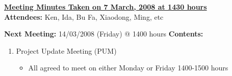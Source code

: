 \documentclass{letter}
\begin{document}
{\large \textbf{\underline{Meeting Minutes Taken on 7 March, 2008 at 1430 hours}}}\\

\textbf{Attendees:} Ken, Ida, Bu Fa, Xiaodong, Ming, etc

\textbf{Next Meeting:} 14/03/2008 (Friday) @ 1400 hours
\textbf{Contents:}

\begin{enumerate}
\item Project Update Meeting (PUM)
	\begin{itemize}
	\item All agreed to meet on either Monday or Friday 1400-1500 hours
	\end{itemize} 
\end{enumerate} 
\end{document}
